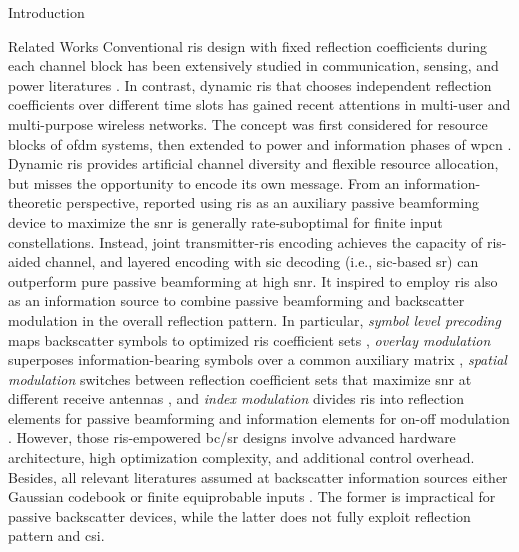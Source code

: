 \documentclass[journal]{IEEEtran}
\begin{document}
\begin{section}{Introduction}
\begin{subsection}{Related Works}
		Conventional \gls{ris} design with fixed reflection coefficients during each channel block has been extensively studied in communication, sensing, and power literatures \cite{Wu2018,Zhang2019a,Lin2022,Liu2022,Feng2022,Zhao2022}.
		In contrast, dynamic \gls{ris} that chooses independent reflection coefficients over different time slots has gained recent attentions in multi-user and multi-purpose wireless networks.
		The concept was first considered for resource blocks of \gls{ofdm} systems, then extended to power and information phases of \gls{wpcn} \cite{Wu2021,Wu2021d,Hua2022a}.
		Dynamic \gls{ris} provides artificial channel diversity and flexible resource allocation, but misses the opportunity to encode its own message.
		From an information-theoretic perspective, \cite{Karasik2020} reported using \gls{ris} as an auxiliary passive beamforming device to maximize the \gls{snr} is generally rate-suboptimal for finite input constellations.
		Instead, joint transmitter-\gls{ris} encoding achieves the capacity of \gls{ris}-aided channel, and layered encoding with \gls{sic} decoding (i.e., \gls{sic}-based \gls{sr}) can outperform pure passive beamforming at high \gls{snr}.
		It inspired \cite{Liu2019d,Bereyhi2020,Xu2020b,Zhang2021d,Hu2021b,Hua2022,Basar2020,Ma2020a,Yuan2021,Hu2021a} to employ \gls{ris} also as an information source to combine passive beamforming and backscatter modulation in the overall reflection pattern.
		In particular, \emph{symbol level precoding} maps backscatter symbols to optimized \gls{ris} coefficient sets \cite{Liu2019d,Bereyhi2020}, \emph{overlay modulation} superposes information-bearing symbols over a common auxiliary matrix \cite{Xu2020b,Zhang2021d,Hu2021b,Hua2022}, \emph{spatial modulation} switches between reflection coefficient sets that maximize \gls{snr} at different receive antennas \cite{Basar2020,Ma2020a,Yuan2021}, and \emph{index modulation} divides \gls{ris} into reflection elements for passive beamforming and information elements for on-off modulation \cite{Hu2021a}.
		However, those \gls{ris}-empowered \gls{bc}/\gls{sr} designs involve advanced hardware architecture, high optimization complexity, and additional control overhead.
		Besides, all relevant literatures assumed at backscatter information sources either Gaussian codebook \cite{Guo2019b,Ding2020,Long2020a,Zhou2019a,Wu2021a,Xu2021a,Yang2021a,Hu2021b} or finite equiprobable inputs \cite{Yang2018,Liang2020,Han2021,Zhang2022,Liu2019d,Bereyhi2020,Xu2020b,Zhang2021d,Hua2022,Basar2020,Ma2020a,Yuan2021,Hu2021a}.
		The former is impractical for passive backscatter devices, while the latter does not fully exploit reflection pattern and \gls{csi}.
	\end{subsection}


\end{section}
\end{document}
